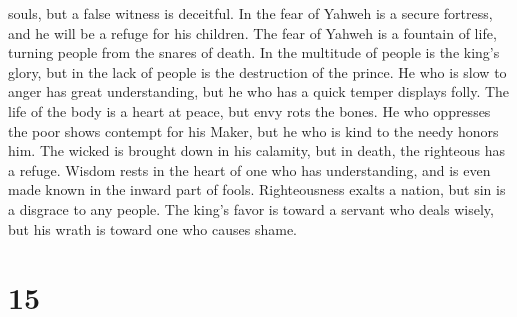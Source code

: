 souls, but a false witness is deceitful.  In the fear of
Yahweh is a secure fortress, and he will be a refuge for his children.
 The fear of Yahweh is a fountain of life, turning people
from the snares of death.  In the multitude of people is
the king's glory, but in the lack of people is the destruction of the
prince.  He who is slow to anger has great understanding,
but he who has a quick temper displays folly.  The life of
the body is a heart at peace, but envy rots the bones.  He
who oppresses the poor shows contempt for his Maker, but he who is kind
to the needy honors him.  The wicked is brought down in his
calamity, but in death, the righteous has a refuge.  Wisdom
rests in the heart of one who has understanding, and is even made known
in the inward part of fools.  Righteousness exalts a
nation, but sin is a disgrace to any people.  The king's
favor is toward a servant who deals wisely, but his wrath is toward one
who causes shame.

\hypertarget{section-14}{%
\section{15}\label{section-14}}

